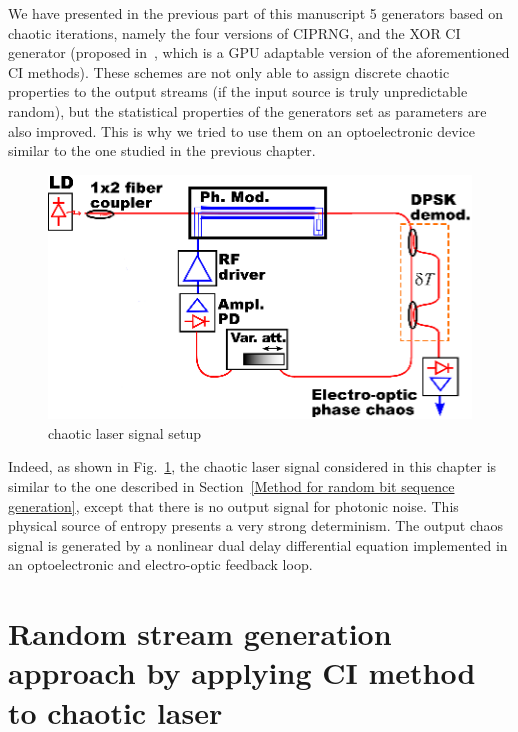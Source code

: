 We have presented in the previous part of this manuscript 5 generators based on 
chaotic iterations, namely the four versions of CIPRNG, and the XOR CI generator 
(proposed in~\cite{DBLP:journals/corr/abs-1112-5239}, which is a GPU adaptable 
version of the aforementioned CI methods). 
These schemes are not only able to assign discrete chaotic properties to the output streams (if the input source is truly unpredictable random), but the statistical properties of the generators set as parameters are also improved.
This is why we tried to use them on an optoelectronic device similar to the
one studied in the previous chapter.

\begin{figure}
\centering
\includegraphics[scale=0.8]{setup_opto_laser.eps}
\caption{chaotic laser signal setup}
\label{chaotic laser signal}
\end{figure}
Indeed, as shown in Fig.~\ref{chaotic laser signal}, the chaotic laser signal considered
in this chapter is similar to the one described in Section~\ref{Method for random bit sequence generation}, except that there is no output signal for photonic noise. 
This physical source of entropy presents a very strong determinism. 
The output chaos signal is generated by a nonlinear dual delay differential 
equation implemented in an optoelectronic and electro-optic feedback loop.

\section{Random stream generation approach by applying CI method to chaotic laser}

